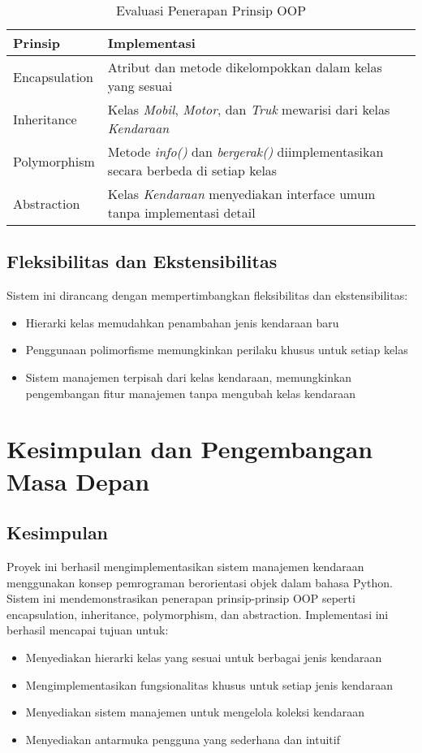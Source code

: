 \documentclass[12pt]{article}
\begin{document}
\begin{table}[h!]
\centering
\caption{Evaluasi Penerapan Prinsip OOP}
\begin{tabular}{|l|p{9cm}|}
\hline
\textbf{Prinsip} & \textbf{Implementasi} \\
\hline
Encapsulation & Atribut dan metode dikelompokkan dalam kelas yang sesuai \\
\hline
Inheritance & Kelas \textit{Mobil}, \textit{Motor}, dan \textit{Truk} mewarisi dari kelas \textit{Kendaraan} \\
\hline
Polymorphism & Metode \textit{info()} dan \textit{bergerak()} diimplementasikan secara berbeda di setiap kelas \\
\hline
Abstraction & Kelas \textit{Kendaraan} menyediakan interface umum tanpa implementasi detail \\
\hline
\end{tabular}
\label{tab:prinsip-oop}
\end{table}

\subsection{Fleksibilitas dan Ekstensibilitas}
Sistem ini dirancang dengan mempertimbangkan fleksibilitas dan ekstensibilitas:
\begin{itemize}
    \item Hierarki kelas memudahkan penambahan jenis kendaraan baru
    \item Penggunaan polimorfisme memungkinkan perilaku khusus untuk setiap kelas
    \item Sistem manajemen terpisah dari kelas kendaraan, memungkinkan pengembangan fitur manajemen tanpa mengubah kelas kendaraan
\end{itemize}

\section{Kesimpulan dan Pengembangan Masa Depan}

\subsection{Kesimpulan}
Proyek ini berhasil mengimplementasikan sistem manajemen kendaraan menggunakan konsep pemrograman berorientasi objek dalam bahasa Python. Sistem ini mendemonstrasikan penerapan prinsip-prinsip OOP seperti encapsulation, inheritance, polymorphism, dan abstraction. Implementasi ini berhasil mencapai tujuan untuk:
\begin{itemize}
    \item Menyediakan hierarki kelas yang sesuai untuk berbagai jenis kendaraan
    \item Mengimplementasikan fungsionalitas khusus untuk setiap jenis kendaraan
    \item Menyediakan sistem manajemen untuk mengelola koleksi kendaraan
    \item Menyediakan antarmuka pengguna yang sederhana dan intuitif
\end{itemize}
\end{document}
